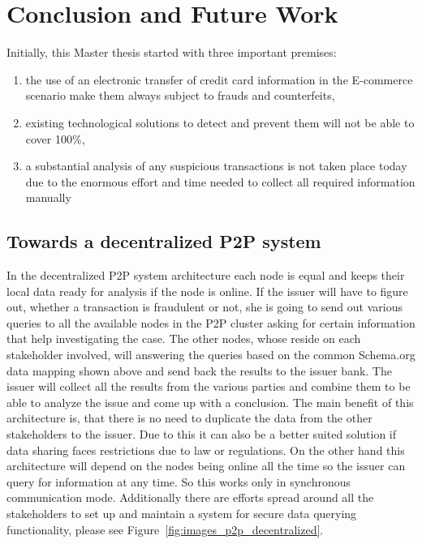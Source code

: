 
\chapter{Conclusion and Future Work} %
\label{cha:conclusion}

Initially, this Master thesis started with three important premises: \@

\begin{enumerate}
	\item the use of an electronic transfer of credit card information in the \gls{E-commerce} scenario make them always subject to frauds and counterfeits,
	\item existing technological solutions to detect and prevent them will not be able to cover 100\%,
	\item a substantial analysis of any suspicious transactions is not taken place today due to the enormous effort and time needed to collect all required information manually
\end{enumerate}

\section{Towards a decentralized \gls{P2P} system}
\label{sec:p2p_decentralized_system}

In the decentralized P2P system architecture each node is equal and keeps their local data ready for analysis if the node is online. If the issuer will have to figure out, whether a transaction is fraudulent or not, she is going to send out various queries to all the available nodes in the P2P cluster asking for certain information that help investigating the case. The other nodes, whose reside on each stakeholder involved, will answering the queries based on the common Schema.org data mapping shown above and send back the results to the issuer bank. The issuer will collect all the results from the various parties and combine them to be able to analyze the issue and come up with a conclusion. The main benefit of this architecture is, that there is no need to duplicate the data from the other stakeholders to the issuer. Due to this it can also be a better suited solution if data sharing faces restrictions due to law or regulations. On the other hand this architecture will depend on the nodes being online all the time so the issuer can query for information at any time. So this works only in synchronous communication mode. Additionally there are efforts spread around all the stakeholders to set up and maintain a system for secure data querying functionality, please see Figure~\ref{fig:images_p2p_decentralized}.

